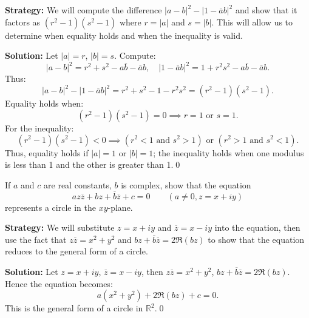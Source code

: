 \noindent\textbf{Strategy:} We will compute the difference $|a - b|^2 - |1 - \overline{a}b|^2$ and show that it factors as $(r^2 - 1)(s^2 - 1)$ where $r = |a|$ and $s = |b|$. This will allow us to determine when equality holds and when the inequality is valid.

\bigskip\noindent\textbf{Solution:}
Let \( |a| = r \), \( |b| = s \). Compute:
\[
|a - b|^2 = r^2 + s^2 - a\overline{b} - \overline{a}b, \quad |1 - \overline{a}b|^2 = 1 + r^2 s^2 - a\overline{b} - \overline{a}b.
\]
Thus:
\[
|a - b|^2 - |1 - \overline{a}b|^2 = r^2 + s^2 - 1 - r^2 s^2 = (r^2 - 1)(s^2 - 1).
\]
Equality holds when:
\[
(r^2 - 1)(s^2 - 1) = 0 \implies r = 1 \text{ or } s = 1.
\]
For the inequality:
\[
(r^2 - 1)(s^2 - 1) < 0 \implies (r^2 < 1 \text{ and } s^2 > 1) \text{ or } (r^2 > 1 \text{ and } s^2 < 1).
\]
Thus, equality holds if \( |a| = 1 \) or \( |b| = 1 \); the inequality holds when one modulus is less than 1 and the other is greater than 1.\qed


\begin{problembox}
\begin{problemstatement}
If \( a \) and \( c \) are real constants, \( b \) is complex, show that the equation
\[
az\overline{z} + bz + \overline{b} \overline{z} + c = 0 \qquad (a \ne 0, z = x + iy)
\]
represents a circle in the \( xy \)-plane.
\end{problemstatement}
\end{problembox}

\noindent\textbf{Strategy:} We will substitute $z = x + iy$ and $\overline{z} = x - iy$ into the equation, then use the fact that $z\overline{z} = x^2 + y^2$ and $bz + \overline{b}\overline{z} = 2\Re(bz)$ to show that the equation reduces to the general form of a circle.

\bigskip\noindent\textbf{Solution:}
Let \( z = x + iy \), \( \overline{z} = x - iy \), then \( z \overline{z} = x^2 + y^2 \), \( bz + \overline{b} \overline{z} = 2 \Re(b z) \). Hence the equation becomes:
\[
a(x^2 + y^2) + 2 \Re(b z) + c = 0.
\]
This is the general form of a circle in \( \mathbb{R}^2 \).\qed



